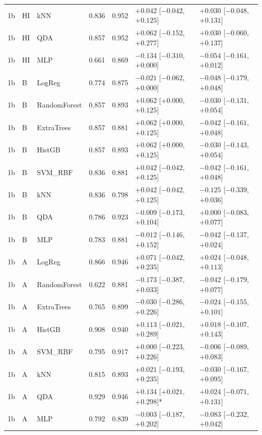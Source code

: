 {\begin{longtable}{@{}lllrrll@{}}
1b & HI & kNN & 0.836 & 0.952 & $+0.042$ [$-0.042$, $+0.125$] & $+0.030$ [$-0.048$, $+0.131$] \\
1b & HI & QDA & 0.857 & 0.952 & $+0.062$ [$-0.152$, $+0.277$] & $+0.030$ [$-0.060$, $+0.137$] \\
1b & HI & MLP & 0.661 & 0.869 & $-0.134$ [$-0.310$, $+0.000$] & $-0.054$ [$-0.161$, $+0.012$] \\
1b & B & LogReg & 0.774 & 0.875 & $-0.021$ [$-0.062$, $+0.000$] & $-0.048$ [$-0.179$, $+0.048$] \\
1b & B & RandomForest & 0.857 & 0.893 & $+0.062$ [$+0.000$, $+0.125$] & $-0.030$ [$-0.131$, $+0.054$] \\
1b & B & ExtraTrees & 0.857 & 0.881 & $+0.062$ [$+0.000$, $+0.125$] & $-0.042$ [$-0.161$, $+0.048$] \\
1b & B & HistGB & 0.857 & 0.893 & $+0.062$ [$+0.000$, $+0.125$] & $-0.030$ [$-0.143$, $+0.054$] \\
1b & B & SVM\_RBF & 0.836 & 0.881 & $+0.042$ [$-0.042$, $+0.125$] & $-0.042$ [$-0.161$, $+0.048$] \\
1b & B & kNN & 0.836 & 0.798 & $+0.042$ [$-0.042$, $+0.125$] & $-0.125$ [$-0.339$, $+0.036$] \\
1b & B & QDA & 0.786 & 0.923 & $-0.009$ [$-0.173$, $+0.104$] & $+0.000$ [$-0.083$, $+0.077$] \\
1b & B & MLP & 0.783 & 0.881 & $-0.012$ [$-0.146$, $+0.152$] & $-0.042$ [$-0.137$, $+0.024$] \\
1b & A & LogReg & 0.866 & 0.946 & $+0.071$ [$-0.042$, $+0.235$] & $+0.024$ [$-0.048$, $+0.113$] \\
1b & A & RandomForest & 0.622 & 0.881 & $-0.173$ [$-0.387$, $+0.033$] & $-0.042$ [$-0.179$, $+0.077$] \\
1b & A & ExtraTrees & 0.765 & 0.899 & $-0.030$ [$-0.286$, $+0.226$] & $-0.024$ [$-0.155$, $+0.101$] \\
1b & A & HistGB & 0.908 & 0.940 & $+0.113$ [$-0.021$, $+0.289$] & $+0.018$ [$-0.107$, $+0.143$] \\
1b & A & SVM\_RBF & 0.795 & 0.917 & $+0.000$ [$-0.223$, $+0.226$] & $-0.006$ [$-0.089$, $+0.083$] \\
1b & A & kNN & 0.815 & 0.893 & $+0.021$ [$-0.193$, $+0.235$] & $-0.030$ [$-0.167$, $+0.095$] \\
1b & A & QDA & 0.929 & 0.946 & $+0.134$ [$+0.021$, $+0.298$]* & $+0.024$ [$-0.071$, $+0.131$] \\
1b & A & MLP & 0.792 & 0.839 & $-0.003$ [$-0.187$, $+0.202$] & $-0.083$ [$-0.232$, $+0.042$] \\

\end{longtable}}
